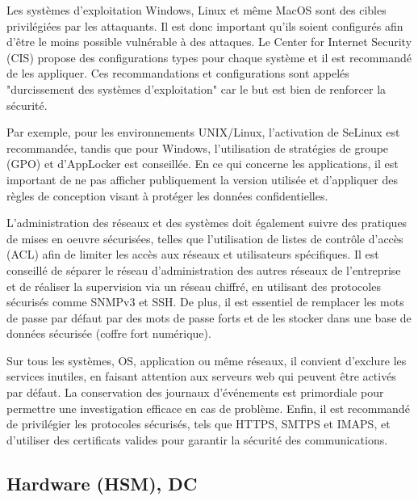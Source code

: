Les systèmes d'exploitation Windows, Linux et même MacOS sont des cibles privilégiées par les attaquants. Il est donc important qu'ils soient configurés afin d'être le moins possible vulnérable à des attaques. Le Center for Internet Security (CIS) propose des configurations types pour chaque système et il est recommandé de les appliquer. Ces recommandations et configurations sont appelés "durcissement des systèmes d'exploitation" car le but est bien de renforcer la sécurité.

Par exemple, pour les environnements UNIX/Linux, l'activation de SeLinux est recommandée, tandis que pour Windows, l'utilisation de stratégies de groupe (GPO) et d'AppLocker est conseillée. En ce qui concerne les applications, il est important de ne pas afficher publiquement la version utilisée et d'appliquer des règles de conception visant à protéger les données confidentielles.

L'administration des réseaux et des systèmes doit également suivre des pratiques de mises en oeuvre sécurisées, telles que l'utilisation de listes de contrôle d'accès (ACL) afin de limiter les accès aux réseaux et utilisateurs spécifiques. Il est conseillé de séparer le réseau d'administration des autres réseaux de l'entreprise et de réaliser la supervision via un réseau chiffré, en utilisant des protocoles sécurisés comme SNMPv3 et SSH. De plus, il est essentiel de remplacer les mots de passe par défaut par des mots de passe forts et de les stocker dans une base de données sécurisée (coffre fort numérique).

Sur tous les systèmes, OS, application ou même réseaux, il convient d'exclure les services inutiles, en faisant attention aux serveurs web qui peuvent être activés par défaut. La conservation des journaux d'événements est primordiale pour permettre une investigation efficace en cas de problème. Enfin, il est recommandé de privilégier les protocoles sécurisés, tels que HTTPS, SMTPS et IMAPS, et d'utiliser des certificats valides pour garantir la sécurité des communications.


\subsection{Hardware (HSM), DC}


